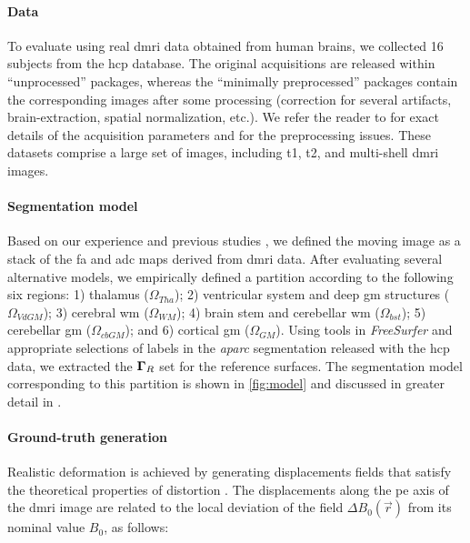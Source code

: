 \paragraph*{Data}
To evaluate \regseg{} using real \gls*{dmri} data obtained from human brains,
  we collected 16 subjects from the \gls*{hcp} database.
The original acquisitions are released within ``unprocessed'' packages, whereas
  the ``minimally preprocessed'' packages contain the corresponding images after
  some processing (correction for several artifacts, brain-extraction, spatial
  normalization, etc.).
We refer the reader to \citep{essen_human_2012} for exact details of the acquisition
  parameters and \citep{glasser_minimal_2013} for the preprocessing issues.
These datasets comprise a large set of images, including \gls*{t1}, \gls*{t2}, and
  multi-shell \gls*{dmri} images.

\paragraph*{Segmentation model}
Based on our experience %
  and previous studies \citep{ennis_orthogonal_2006},
  we defined the moving image as a stack of the \gls*{fa} and \gls*{adc} maps derived
  from \gls*{dmri} data.
After evaluating several alternative models, we empirically defined a partition \omegaset{}
  according to the following six regions:
  1) thalamus ($\Omega_{Tha}$);
  2) ventricular system and deep \gls*{gm} structures ($\Omega_{VdGM}$);
  3) cerebral \gls*{wm} ($\Omega_{WM}$);
  4) brain stem and cerebellar \gls*{wm} ($\Omega_{bst}$);
  5) cerebellar \gls*{gm} ($\Omega_{cbGM}$); and
  6) cortical \gls*{gm} ($\Omega_{GM}$).
Using tools in \emph{FreeSurfer} and appropriate selections of labels in the
  \emph{aparc} segmentation released with the \gls*{hcp} data, we extracted the $\boldsymbol{\Gamma}_R$ set for the
  reference surfaces.
The segmentation model corresponding to this partition is shown in \autoref{fig:model}
  and discussed in greater detail in .

\paragraph*{Ground-truth generation}
Realistic deformation is achieved by generating displacements fields that satisfy the theoretical
  properties of distortion \citep{jezzard_correction_1995}.
The displacements along the \gls*{pe} axis of the \gls*{dmri} image are related to the local
  deviation of the field $\Delta B_0(\vec{r})$ from its nominal value $B_0$, as follows:

